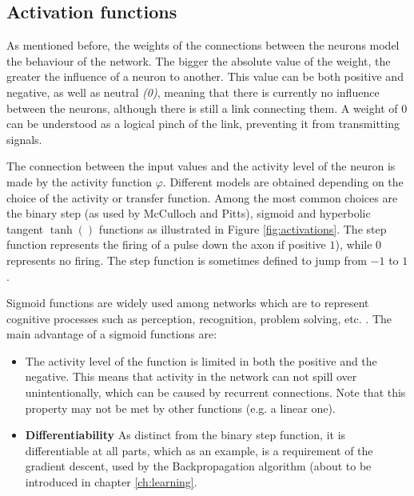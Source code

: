 \documentclass[10pt,a4paper,DIV=11]{scrreprt}
\begin{document}
\subsection{Activation functions}

As mentioned before, the weights of the connections between the neurons model the behaviour of the network. The bigger the absolute 
value of the weight, the greater the influence of a neuron to another. This value can be both positive and negative, as well as 
neutral \textit{(0)}, meaning that there is currently no influence between the neurons, although there is still a link connecting them. 
A weight of 0 can be understood as a logical pinch of the link, preventing it from transmitting signals.


The connection between the input values and the activity level of the neuron is made by the activity function $\varphi$. Different models are 
obtained depending on the choice of the activity or transfer function. Among the most common choices are the binary step (as used by McCulloch and Pitts), 
sigmoid and hyperbolic tangent $\tanh()$ functions as illustrated in Figure \ref{fig:activations}. The step function represents the firing of a pulse down the axon 
if positive $1$), while $0$ represents no firing. The step function is sometimes defined to jump from $-1$ to $1$. 

Sigmoid functions are widely used among networks which are to represent cognitive processes such as perception, recognition, problem solving, 
etc. . 
The main advantage of a sigmoid functions are:

\begin{itemize}
\item The activity level of the function is limited in both the positive and the negative. This means that activity in the network can not spill 
      over unintentionally, which can be caused by recurrent connections. Note that this property may not be met by other functions (e.g. a linear one).
\item \textbf{Differentiability}
As distinct from the binary step function, it is differentiable at all parts, which as an example, is a requirement of the gradient descent,
used by the Backpropagation algorithm (about to be introduced in chapter \ref{ch:learning}.
\end{itemize}
\end{document}
